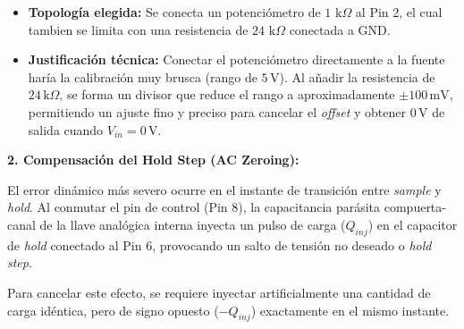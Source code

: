 \begin{itemize}
	\item \textbf{Topología elegida:} Se conecta un potenciómetro de $1\text{ k}\Omega$ al Pin 2, el cual tambien se limita con una resistencia de $24\text{ k}\Omega$ conectada a GND.
	\item \textbf{Justificación técnica:} Conectar el potenciómetro directamente a la fuente haría la calibración muy brusca (rango de $5\,\text{V}$). Al añadir la resistencia de $24\,\text{k}\Omega$, se forma un divisor que reduce el rango a aproximadamente $\pm 100\,\text{mV}$, permitiendo un ajuste fino y preciso para cancelar el \textit{offset} y obtener $0\,\text{V}$ de salida cuando $V_{in} = 0\,\text{V}$.
\end{itemize}
\newpage
\textbf{2. Compensación del Hold Step (AC Zeroing):}

El error dinámico más severo ocurre en el instante de transición entre \textit{sample} y \textit{hold}. Al conmutar el pin de control (Pin 8), la capacitancia parásita compuerta-canal de la llave analógica interna inyecta un pulso de carga ($Q_{inj}$) en el capacitor de \textit{hold} conectado al Pin 6, provocando un salto de tensión no deseado o \textit{hold step}.

Para cancelar este efecto, se requiere inyectar artificialmente una cantidad de carga idéntica, pero de signo opuesto ($-Q_{inj}$) exactamente en el mismo instante. 

